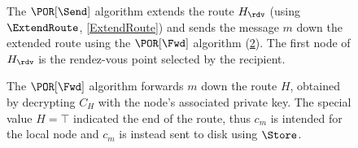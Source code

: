 \begin{figure}
  \caption{\label{SPORSend}%
    The \(\POR[\Send]\) algorithm extends the route \(H_\rdv\) (using 
    \(\ExtendRoute\), \cref{ExtendRoute}) and sends the message \(m\) down the 
    extended route using the \(\POR[\Fwd]\) algorithm (\cref{SPORFwd}).
    The first node of \(H_\rdv\) is the rendez-vous point selected by the 
    recipient.
  }
\end{figure}

\begin{figure}
  \caption{\label{SPORFwd}%
    The \(\POR[\Fwd]\) algorithm forwards \(m\) down the route \(H\), obtained 
    by decrypting \(C_H\) with the node's associated private key.
    The special value \(H = \top\) indicated the end of the route, thus \(c_m\) 
    is intended for the local node and \(c_m\) is instead sent to disk using 
    \(\Store\).%
  }
\end{figure}

